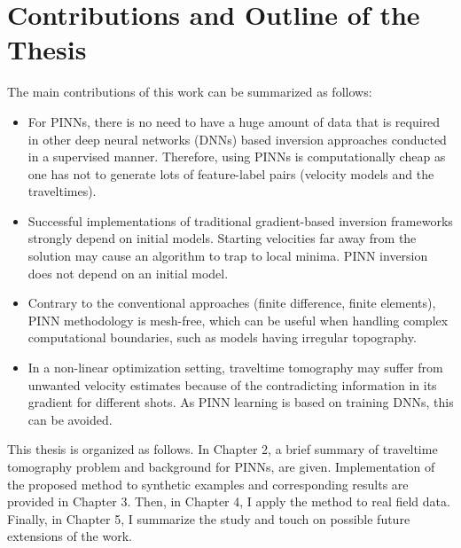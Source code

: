 \section{Contributions and Outline of the Thesis}
\label{sec:contribution}

The main contributions of this work can be summarized as follows:

\begin{itemize}
  \item For PINNs, there is no need to have a huge amount of data that is required in other deep neural networks (DNNs) based inversion approaches conducted in a supervised manner. Therefore, using PINNs is computationally cheap as one has not to generate lots of feature-label pairs (velocity models and the traveltimes).
  \item Successful implementations of traditional gradient-based inversion frameworks strongly depend on initial models. Starting velocities far away from the solution may cause an algorithm to trap to local minima. PINN inversion does not depend on an initial model.
  \item Contrary to the conventional approaches (finite difference, finite elements), PINN methodology is mesh-free, which can be useful when handling complex computational boundaries, such as models having irregular topography.
  \item In a non-linear optimization setting, traveltime tomography may suffer from unwanted velocity estimates because of the contradicting information in its gradient for different shots. As PINN learning is based on training DNNs, this can be avoided.
\end{itemize}

This thesis is organized as follows. In Chapter 2, a brief summary of traveltime tomography problem and background for PINNs, are given. Implementation of the proposed method to synthetic examples and corresponding results are provided in Chapter 3. Then, in Chapter 4, I apply the method to real field data. Finally, in Chapter 5, I summarize the study and touch on possible future extensions of the work.